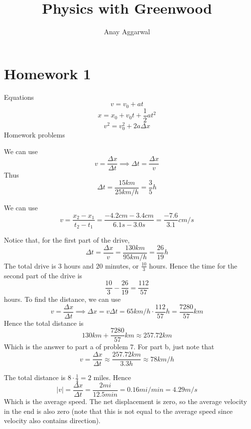 \documentclass[11pt]{scrartcl}
\title{Physics with Greenwood}
\author{Anay Aggarwal}
\begin{document}
\maketitle

\section{Homework 1}
Equations
$$v=v_0+at$$
$$x=x_0+v_0t+\frac12 at^2$$
$$v^2=v_0^2+2a\Delta x$$
Homework problems
\begin{example}
  [Problem 2]
\end{example}
\begin{soln}
  We can use
  $$v=\frac{\Delta x}{\Delta t}\implies \Delta t = \frac{\Delta x}{v}$$
  Thus
  $$\Delta t=\frac{15 km}{25 km/h}=\frac{3}{5}h$$
\end{soln}
\begin{example}
  [Problem 5]
\end{example}
\begin{soln}
  We can use
  $$v=\frac{x_2-x_1}{t_2-t_1}=\frac{-4.2cm-3.4cm}{6.1s-3.0s}=\frac{-7.6}{3.1}cm/s$$
\end{soln}
\begin{example}
  [Problem 7]
\end{example}
\begin{soln}
  Notice that, for the first part of the drive,
  $$\Delta t=\frac{\Delta x}{v}=\frac{130km}{95 km/h}=\frac{26}{19}h$$
  The total drive is $3$ hours and $20$ minutes, or $\frac{10}{3}$ hours.
  Hence the time for the second part of the drive is
  $$\frac{10}{3}-\frac{26}{19}=\frac{112}{57}$$
  hours. To find the distance, we can use
  $$v=\frac{\Delta x}{\Delta t}\implies \Delta x=v\Delta t=65 km/h\cdot \frac{112}{57}h=\frac{7280}{57}km$$
  Hence the total distance is
  $$130km+\frac{7280}{57}km\approx 257.72km$$
  Which is the answer to part a of problem $7$.
  For part b, just note that
  $$v=\frac{\Delta x}{\Delta t}\approx \frac{257.72km}{3.3h}\approx 78 km/h$$
\end{soln}
\begin{example}
  [Problem 9]
\end{example}
\begin{soln}
  The total distance is $8\cdot \frac{1}{4}=2$ miles. Hence
  $$|v|=\frac{\Delta x}{\Delta t}=\frac{2 mi}{12.5 min}=0.16 mi/min=4.29 m/s$$
  Which is the average speed. The net displacement is zero, so the average velocity
  in the end is also zero (note that this is not equal to the average speed since velocity
  also contains direction).
\end{soln}
\end{document}

